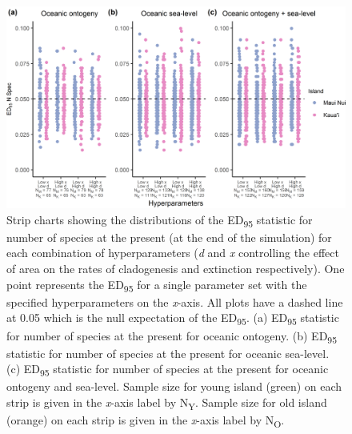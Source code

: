 \begin{figure}
    \centering
    \includegraphics{Hyperparameters_num_spec.png}
    \caption{Strip charts showing the distributions of the ED\textsubscript{95} statistic for number of species at the present (at the end of the simulation) for each combination of hyperparameters (\textit{d} and \textit{x} controlling the effect of area on the rates of cladogenesis and extinction respectively). One point represents the ED\textsubscript{95} for a single parameter set with the specified hyperparameters on the \textit{x}-axis. All plots have a dashed line at 0.05 which is the null expectation of the ED\textsubscript{95}. (a) ED\textsubscript{95} statistic for number of species at the present for oceanic ontogeny. (b) ED\textsubscript{95} statistic for number of species at the present for oceanic sea-level. (c) ED\textsubscript{95} statistic for number of species at the present for oceanic ontogeny and sea-level. Sample size for young island (green) on each strip is given in the \textit{x}-axis label by N\textsubscript{Y}. Sample size for old island (orange) on each strip is given in the \textit{x}-axis label by N\textsubscript{O}.}
    \label{fig:Hyperparameters_num_spec}
\end{figure}


